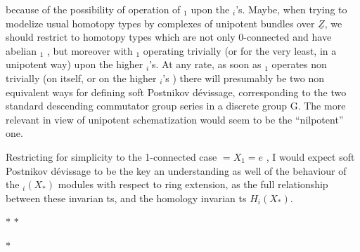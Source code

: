 
because of the possibility of operation of \hand{$\pi$}$_1$ upon the \hand{$\pi$}$_i$'s. Maybe,
when trying to modelize usual homotopy types by complexes of unipotent
bundles over $\underline{Z}$, we should restrict to homotopy types which are not only
0-connected and have abelian \hand{$\pi$}$_1$ , but moreover with \hand{$\pi$}$_1$ operating
trivially (or for the very least, in a unipotent way) upon the higher
\hand{$\pi$}$_i$'s. At any rate, as soon as \hand{$\pi$}$_1$ operates non trivially (on itself, or
on the higher \hand{$\pi$}$_i$'s ) there will presumably be two non equivalent ways for
defining soft Postnikov dévissage, corresponding to the two standard
descending commutator group series in a discrete group G. The more relevant
 in view of unipotent schematization would seem to be the ``nilpotent''
one.

Restricting for simplicity to the 1-connected case $=X_1=e$ , I would
expect soft Postnikov dévissage to be the key  an understanding as well
of the behaviour of the \hand{$\pi$}$_i(X_*)$ modules with respect to ring extension,
as  the full relationship between these invarian ts, and the homology
invarian ts $H_i(X_*)$.

$*$ \quad $*$

$*$

